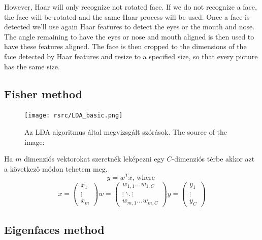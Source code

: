 However, Haar will only recognize not rotated face. If we do not recognize a face, the face will be rotated and the same Haar process will be used. Once a face is detected we'll use again Haar features to detect the eyes or the mouth and nose. The angle remaining to have the eyes or nose and mouth aligned is then used to have these features aligned. The face is then cropped to the dimensions of the face detected by Haar features and resize to a specified size, so that every picture has the same size.


\subsection{Fisher method}
\begin{figure}
	\centering		
	\texttt{[image: rsrc/LDA\_basic.png]}
	\caption{Az LDA algoritmus által megvizsgált szórások. The source of the image: \cite{LDA}}
	\label{fig:LDA abrazolas}
\end{figure}

Ha $ m $ dimenziós vektorokat szeretnék leképezni egy $ C $-dimenziós térbe akkor azt a következő módon tehetem meg.
\begin{equation}
y = w^Tx \textrm{, where } 
\end{equation}
\begin{equation}
x = \left(
\begin{array}{ccc}
x_1\\
\vdots\\
x_m
\end{array} \right)
w=\left(
\begin{array}{ccc}
w_{1,1} \dots w_{1,C}\\
\vdots \ddots \vdots\\
w_{m,1} \dots w_{m,C}
\end{array}
\right)
y = \left(
\begin{array}{ccc}
y_1\\
\vdots\\
y_C
\end{array}\right)
\label{equ:Alap_egyenlet}
\end{equation}

\subsection{Eigenfaces method}

